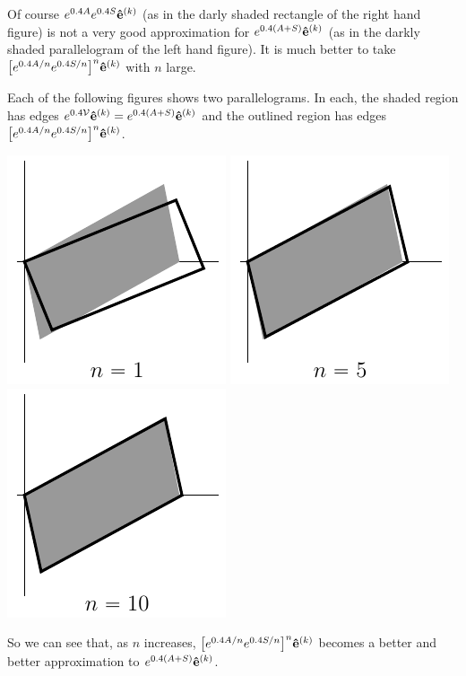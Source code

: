 \begin{eg}[$\ \vv(x,y)= 2y\hi.$]
\begin{wfig}
\begin{center}
\end{center}
\end{wfig}
Of course $e^{0.4A}e^{0.4S}\mathbf{\hat e}^{(k)}$ (as in the darly shaded rectangle of the right hand figure) is not a very good approximation for $e^{0.4(A+S)}\mathbf{\hat e}^{(k)}$ 
(as in the darkly shaded parallelogram of the left hand figure). 
It is much better to take $\big[e^{0.4A/n}e^{0.4S/n}\big]^{n}\mathbf{\hat e}^{(k)}$ with $n$ large. 

Each of the following figures shows two parallelograms. In each,
the shaded region has edges
$e^{0.4\mathcal{V}}\mathbf{\hat e}^{(k)}=e^{0.4(A+S)}\mathbf{\hat e}^{(k)}$ and the outlined region has edges 
$\big[e^{0.4A/n}e^{0.4S/n}\big]^{n}\mathbf{\hat e}^{(k)}$.
\begin{wfig}
\begin{center}
    \includegraphics{square6.pdf}\qquad
    \includegraphics{square7.pdf}\qquad
    \includegraphics{square8.pdf}
\end{center}
\end{wfig}
So we can see that, as $n$ increases, $\big[e^{0.4A/n}e^{0.4S/n}\big]^{n}\mathbf{\hat e}^{(k)}$
becomes a better and better approximation to $e^{0.4(A+S)}\mathbf{\hat e}^{(k)}$.

\end{eg}









